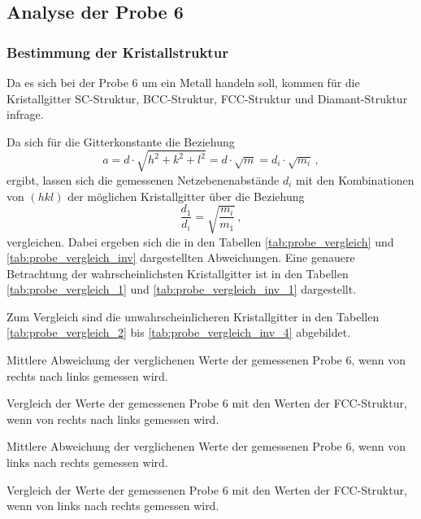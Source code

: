 \subsection{Analyse der Probe 6} %
\label{sub:analyse_der_probe_6}

\subsubsection{Bestimmung der Kristallstruktur} %
\label{ssub:bestimmung_der_kristallstruktur_probe}

Da es sich bei der Probe 6 um ein Metall handeln soll,
kommen für die Kristallgitter SC-Struktur, BCC-Struktur, FCC-Struktur und Diamant-Struktur infrage.

Da sich für die Gitterkonstante die Beziehung
\begin{equation*}
    a = d \cdot \sqrt{h^2 + k^2 + l^2} = d \cdot \sqrt{m} = d_i \cdot \sqrt{m_i}\,,
\end{equation*}
ergibt,
lassen sich die gemessenen Netzebenenabstände $d_i$ mit den Kombinationen von $(h k l)$
der möglichen Kristallgitter über die Beziehung
\begin{equation*}
    \frac{d_1}{d_i} = \sqrt{\frac{m_i}{m_1}}\,,
\end{equation*}
vergleichen.
Dabei ergeben sich die in den Tabellen \ref{tab:probe_vergleich} und \ref{tab:probe_vergleich_inv}
dargestellten Abweichungen.
Eine genauere Betrachtung der wahrscheinlichsten Kristallgitter ist in den Tabellen \ref{tab:probe_vergleich_1} und \ref{tab:probe_vergleich_inv_1} dargestellt.

Zum Vergleich sind die unwahrscheinlicheren Kristallgitter in den Tabellen \ref{tab:probe_vergleich_2} bis \ref{tab:probe_vergleich_inv_4} abgebildet.

\begin{table}[!ht]
    \centering
    \caption{Mittlere Abweichung der verglichenen Werte der gemessenen Probe 6, wenn von rechts nach links gemessen wird.}
    
    \label{tab:probe_vergleich}
\end{table}
\begin{table}[!ht]
    \centering
    \caption{Vergleich der Werte der gemessenen Probe 6 mit den Werten der FCC-Struktur, wenn von rechts nach links gemessen wird.}
    
    \label{tab:probe_vergleich_1}
\end{table}
\begin{table}[!ht]
    \centering
    \caption{Mittlere Abweichung der verglichenen Werte der gemessenen Probe 6, wenn von links nach rechts gemessen wird.}
    
    \label{tab:probe_vergleich_inv}
\end{table}
\begin{table}[!ht]
    \centering
    \caption{Vergleich der Werte der gemessenen Probe 6 mit den Werten der FCC-Struktur, wenn von links nach rechts gemessen wird.}
    
    \label{tab:probe_vergleich_inv_1}
\end{table}

